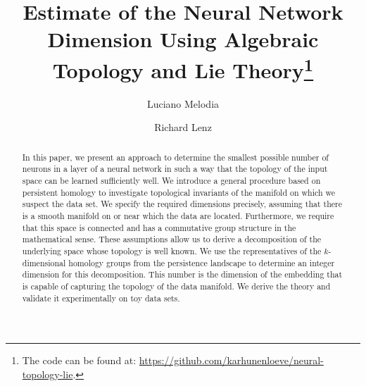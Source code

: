 \documentclass[runningheads,orivec]{llncs}
\begin{document}
%
\title{Estimate of the Neural Network Dimension Using Algebraic Topology and Lie Theory\thanks{The code can be found at: \href{https://github.com/karhunenloeve/ neural-topology-lie}{https://github.com/karhunenloeve/neural-topology-lie}.}}
%
%

\author{Luciano Melodia \\
\and Richard Lenz}
%
%
%
\maketitle              %
%
\begin{abstract}
In this paper, we present an approach to determine the smallest possible number of neurons in a layer of a neural network in such a way that the topology of the input space can be learned sufficiently well. We introduce a general procedure based on persistent homology to investigate topological invariants of the manifold on which we suspect the data set. We specify the required dimensions precisely, assuming that there is a smooth manifold on or near which the data are located. Furthermore, we require that this space is connected and has a commutative group structure in the mathematical sense. These assumptions allow us to derive a decomposition of the underlying space whose topology is well known. We use the representatives of the $k$-dimensional homology groups from the persistence landscape to determine an integer dimension for this decomposition. This number is the dimension of the embedding that is capable of capturing the topology of the data manifold. We derive the theory and validate it experimentally on toy data sets. 

\end{abstract}
\end{document}
